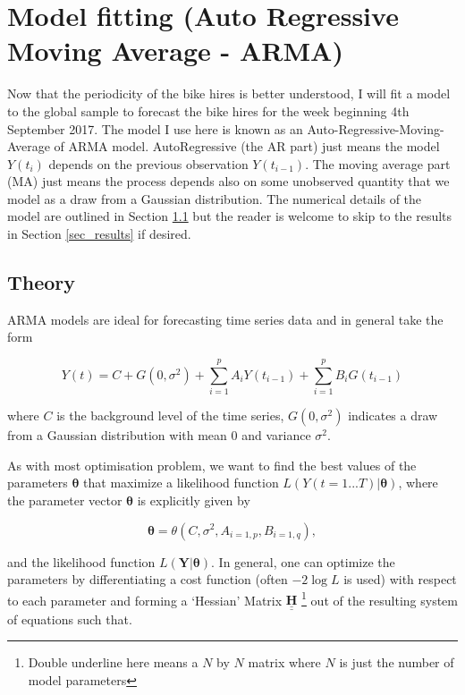 \documentclass[10pt]{article}
\begin{document}
\section{Model fitting (Auto Regressive Moving Average - ARMA)}
\label{sec_model}


Now that the periodicity of the bike hires is better understood, I will fit a model to the global sample to forecast the bike hires for the week beginning 4th September 2017. The model I use here is known as an Auto-Regressive-Moving-Average of ARMA model. AutoRegressive (the AR part) just means the model $Y(t_i)$ depends on the previous observation $Y(t_{i-1})$. The moving average part (MA) just means the process depends also on some unobserved quantity that we model as a draw from a Gaussian distribution. The numerical details of the model are outlined in Section \ref{sec_theory} but the reader is welcome to skip to the results in Section \ref{sec_results} if desired.


\subsection{Theory}
\label{sec_theory}
ARMA models are ideal for forecasting time series data and in general take the form

\begin{equation}
\label{eq_arma}
Y(t) = C + G(0,\sigma^2) + \sum_{i=1}^{p} A_i Y(t_{i-1}) + \sum_{i=1}^{p} B_i G(t_{i-1})
\end{equation}


\noindent where $C$ is the background level of the time series, $G(0,\sigma^2)$ indicates a draw from a Gaussian distribution with mean $0$ and variance $\sigma^2$. 


As with most optimisation problem, we want to find the best values of the parameters $\mathbf{\theta}$ that maximize a likelihood function $L( Y(t=1...T) | \mathbf{\theta})$, where the parameter vector $\mathbf{\theta}$ is explicitly given by

\begin{equation}
\mathbf{\theta} = \theta \left(C, \sigma^2 , A_{i=1,p}, B_{i=1,q}  \right),
\end{equation}

\noindent and the likelihood function $L( \mathbf{Y} | \mathbf{\theta})$. In general, one can optimize the parameters by differentiating a cost function (often $-2 \log L$ is used) with respect to each parameter and forming a `Hessian' Matrix $\underline{\underline{\mathbf{H}}}$ \footnote{Double underline here means a $N$ by $N$ matrix where $N$ is just the number of model parameters} out of the resulting system of equations such that.
\end{document}
